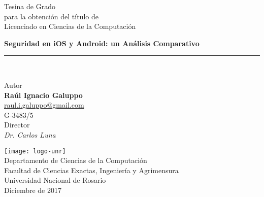 \begin{titlepage}
    \begin{center}
        \LARGE
        Tesina de Grado\\
        \Large
        para la obtenci\'on del t\'itulo de\\
        Licenciado en Ciencias de la Computaci\'on
        \vfill
        
        \Huge
        \textbf{Seguridad en iOS y Android: un Análisis Comparativo}
        \rule{\textwidth}{1pt}\\
        \vspace{0.5cm}

        \large
        Autor\\
        \Large
        \textbf{Raúl Ignacio Galuppo}\\
        \normalsize
        \href{mailto:raul.i.galuppo@gmail.com}{raul.i.galuppo@gmail.com}\\
        G-3483/5\\
        \vspace{0.5cm}
        \large
        Director\\
        \Large
        \emph{Dr. Carlos Luna}\\
        \vfill
        
        \texttt{[image: logo-unr]}\\
        \Large
        Departamento de Ciencias de la Computación\\
        Facultad de Ciencias Exactas, Ingeniería y Agrimensura\\
        Universidad Nacional de Rosario\\
        Diciembre de 2017
    \end{center}
\end{titlepage}